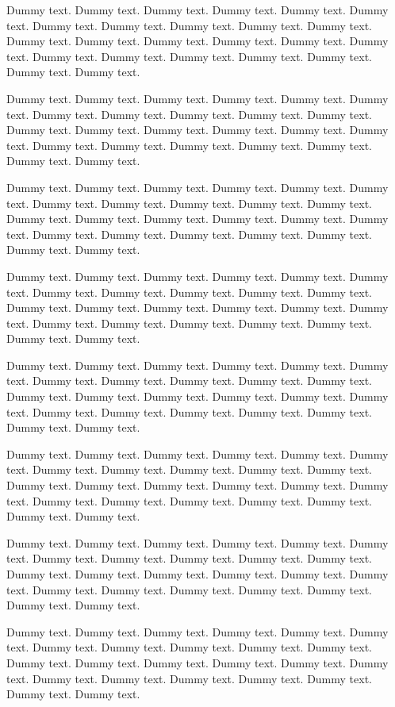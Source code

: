 \documentclass[10pt,letterpaper,twocolumn]{article} %
\begin{document}
Dummy text. Dummy text. Dummy text. Dummy text. Dummy text. Dummy text. Dummy text. Dummy text. Dummy text. Dummy text. Dummy text. Dummy text. Dummy text. Dummy text. Dummy text. Dummy text. Dummy text. Dummy text. Dummy text. Dummy text. Dummy text. Dummy text. Dummy text. Dummy text. 

Dummy text. Dummy text. Dummy text. Dummy text. Dummy text. Dummy text. Dummy text. Dummy text. Dummy text. Dummy text. Dummy text. Dummy text. Dummy text. Dummy text. Dummy text. Dummy text. Dummy text. Dummy text. Dummy text. Dummy text. Dummy text. Dummy text. Dummy text. Dummy text. 

Dummy text. Dummy text. Dummy text. Dummy text. Dummy text. Dummy text. Dummy text. Dummy text. Dummy text. Dummy text. Dummy text. Dummy text. Dummy text. Dummy text. Dummy text. Dummy text. Dummy text. Dummy text. Dummy text. Dummy text. Dummy text. Dummy text. Dummy text. Dummy text. 

Dummy text. Dummy text. Dummy text. Dummy text. Dummy text. Dummy text. Dummy text. Dummy text. Dummy text. Dummy text. Dummy text. Dummy text. Dummy text. Dummy text. Dummy text. Dummy text. Dummy text. Dummy text. Dummy text. Dummy text. Dummy text. Dummy text. Dummy text. Dummy text. 

Dummy text. Dummy text. Dummy text. Dummy text. Dummy text. Dummy text. Dummy text. Dummy text. Dummy text. Dummy text. Dummy text. Dummy text. Dummy text. Dummy text. Dummy text. Dummy text. Dummy text. Dummy text. Dummy text. Dummy text. Dummy text. Dummy text. Dummy text. Dummy text. 

Dummy text. Dummy text. Dummy text. Dummy text. Dummy text. Dummy text. Dummy text. Dummy text. Dummy text. Dummy text. Dummy text. Dummy text. Dummy text. Dummy text. Dummy text. Dummy text. Dummy text. Dummy text. Dummy text. Dummy text. Dummy text. Dummy text. Dummy text. Dummy text. 



Dummy text. Dummy text. Dummy text. Dummy text. Dummy text. Dummy text. Dummy text. Dummy text. Dummy text. Dummy text. Dummy text. Dummy text. Dummy text. Dummy text. Dummy text. Dummy text. Dummy text. Dummy text. Dummy text. Dummy text. Dummy text. Dummy text. Dummy text. Dummy text. 


Dummy text. Dummy text. Dummy text. Dummy text. Dummy text. Dummy text. Dummy text. Dummy text. Dummy text. Dummy text. Dummy text. Dummy text. Dummy text. Dummy text. Dummy text. Dummy text. Dummy text. Dummy text. Dummy text. Dummy text. Dummy text. Dummy text. Dummy text. Dummy text. 
\end{document}
